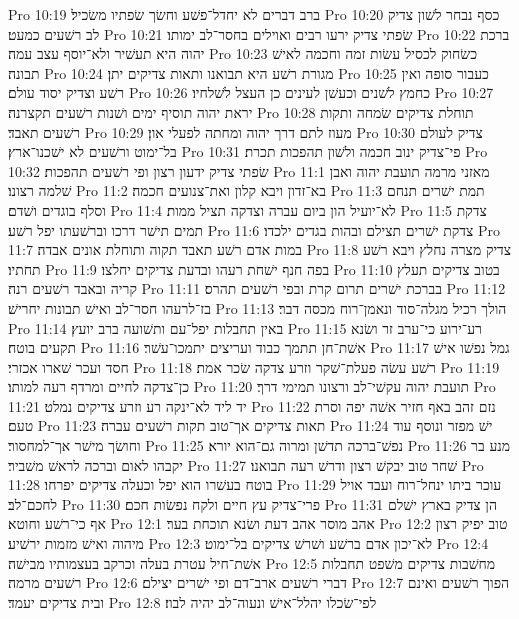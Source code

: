 Pro 10:19  ברב דברים לא יחדל־פשׁע וחשׂך שׂפתיו משׂכיל׃
Pro 10:20  כסף נבחר לשׁון צדיק לב רשׁעים כמעט׃
Pro 10:21  שׂפתי צדיק ירעו רבים ואוילים בחסר־לב ימותו׃
Pro 10:22  ברכת יהוה היא תעשׁיר ולא־יוסף עצב עמה׃
Pro 10:23  כשׂחוק לכסיל עשׂות זמה וחכמה לאישׁ תבונה׃
Pro 10:24  מגורת רשׁע היא תבואנו ותאות צדיקים יתן׃
Pro 10:25  כעבור סופה ואין רשׁע וצדיק יסוד עולם׃
Pro 10:26  כחמץ לשׁנים וכעשׁן לעינים כן העצל לשׁלחיו׃
Pro 10:27  יראת יהוה תוסיף ימים ושׁנות רשׁעים תקצרנה׃
Pro 10:28  תוחלת צדיקים שׂמחה ותקות רשׁעים תאבד׃
Pro 10:29  מעוז לתם דרך יהוה ומחתה לפעלי און׃
Pro 10:30  צדיק לעולם בל־ימוט ורשׁעים לא ישׁכנו־ארץ׃
Pro 10:31  פי־צדיק ינוב חכמה ולשׁון תהפכות תכרת׃
Pro 10:32  שׂפתי צדיק ידעון רצון ופי רשׁעים תהפכות׃
Pro 11:1  מאזני מרמה תועבת יהוה ואבן שׁלמה רצונו׃
Pro 11:2  בא־זדון ויבא קלון ואת־צנועים חכמה׃
Pro 11:3  תמת ישׁרים תנחם וסלף בוגדים ושׁדם׃
Pro 11:4  לא־יועיל הון ביום עברה וצדקה תציל ממות׃
Pro 11:5  צדקת תמים תישׁר דרכו וברשׁעתו יפל רשׁע׃
Pro 11:6  צדקת ישׁרים תצילם ובהות בגדים ילכדו׃
Pro 11:7  במות אדם רשׁע תאבד תקוה ותוחלת אונים אבדה׃
Pro 11:8  צדיק מצרה נחלץ ויבא רשׁע תחתיו׃
Pro 11:9  בפה חנף ישׁחת רעהו ובדעת צדיקים יחלצו׃
Pro 11:10  בטוב צדיקים תעלץ קריה ובאבד רשׁעים רנה׃
Pro 11:11  בברכת ישׁרים תרום קרת ובפי רשׁעים תהרס׃
Pro 11:12  בז־לרעהו חסר־לב ואישׁ תבונות יחרישׁ׃
Pro 11:13  הולך רכיל מגלה־סוד ונאמן־רוח מכסה דבר׃
Pro 11:14  באין תחבלות יפל־עם ותשׁועה ברב יועץ׃
Pro 11:15  רע־ירוע כי־ערב זר ושׂנא תקעים בוטח׃
Pro 11:16  אשׁת־חן תתמך כבוד ועריצים יתמכו־עשׁר׃
Pro 11:17  גמל נפשׁו אישׁ חסד ועכר שׁארו אכזרי׃
Pro 11:18  רשׁע עשׂה פעלת־שׁקר וזרע צדקה שׂכר אמת׃
Pro 11:19  כן־צדקה לחיים ומרדף רעה למותו׃
Pro 11:20  תועבת יהוה עקשׁי־לב ורצונו תמימי דרך׃
Pro 11:21  יד ליד לא־ינקה רע וזרע צדיקים נמלט׃
Pro 11:22  נזם זהב באף חזיר אשׁה יפה וסרת טעם׃
Pro 11:23  תאות צדיקים אך־טוב תקות רשׁעים עברה׃
Pro 11:24  ישׁ מפזר ונוסף עוד וחושׂך מישׁר אך־למחסור׃
Pro 11:25  נפשׁ־ברכה תדשׁן ומרוה גם־הוא יורא׃
Pro 11:26  מנע בר יקבהו לאום וברכה לראשׁ משׁביר׃
Pro 11:27  שׁחר טוב יבקשׁ רצון ודרשׁ רעה תבואנו׃
Pro 11:28  בוטח בעשׁרו הוא יפל וכעלה צדיקים יפרחו׃
Pro 11:29  עוכר ביתו ינחל־רוח ועבד אויל לחכם־לב׃
Pro 11:30  פרי־צדיק עץ חיים ולקח נפשׂות חכם׃
Pro 11:31  הן צדיק בארץ ישׁלם אף כי־רשׁע וחוטא׃
Pro 12:1  אהב מוסר אהב דעת ושׂנא תוכחת בער׃
Pro 12:2  טוב יפיק רצון מיהוה ואישׁ מזמות ירשׁיע׃
Pro 12:3  לא־יכון אדם ברשׁע ושׁרשׁ צדיקים בל־ימוט׃
Pro 12:4  אשׁת־חיל עטרת בעלה וכרקב בעצמותיו מבישׁה׃
Pro 12:5  מחשׁבות צדיקים משׁפט תחבלות רשׁעים מרמה׃
Pro 12:6  דברי רשׁעים ארב־דם ופי ישׁרים יצילם׃
Pro 12:7  הפוך רשׁעים ואינם ובית צדיקים יעמד׃
Pro 12:8  לפי־שׂכלו יהלל־אישׁ ונעוה־לב יהיה לבוז׃
